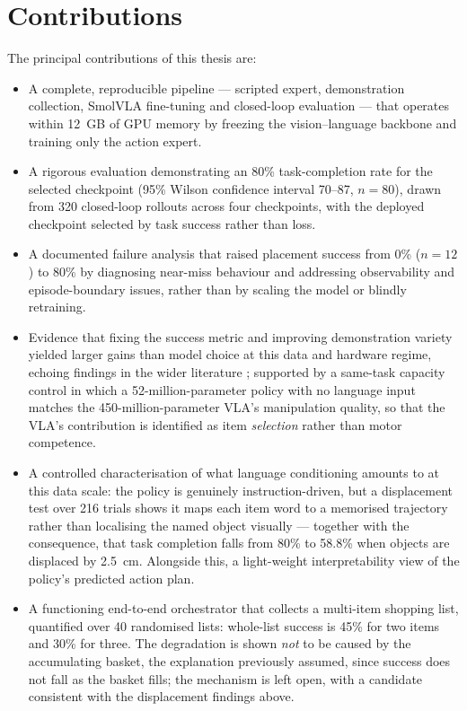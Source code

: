 \section{Contributions}
\label{sec:contributions}
The principal contributions of this thesis are:
\begin{itemize}
    \item A complete, reproducible pipeline --- scripted expert, demonstration
    collection, SmolVLA fine-tuning and closed-loop evaluation --- that operates
    within 12~GB of GPU memory by freezing the vision--language backbone and
    training only the action expert.
    \item A rigorous evaluation demonstrating an 80\% task-completion rate for the
    selected checkpoint (95\% Wilson confidence interval 70--87, $n=80$), drawn from
    320 closed-loop rollouts across four checkpoints, with the deployed checkpoint
    selected by task success rather than loss.
    \item A documented failure analysis that raised placement success from 0\%
    ($n=12$) to 80\% by diagnosing near-miss behaviour and addressing observability and
    episode-boundary issues, rather than by scaling the model or blindly
    retraining.
    \item Evidence that fixing the success metric and improving demonstration
    variety yielded larger gains than model choice at this data and hardware
    regime, echoing findings in the wider literature
    \parencite{black2025pi05, bharadhwaj2024roboagent}; supported by a same-task
    capacity control in which a 52-million-parameter policy with no language input
    matches the 450-million-parameter VLA's manipulation quality, so that the VLA's
    contribution is identified as item \emph{selection} rather than motor competence.
    \item A controlled characterisation of what language conditioning amounts to at
    this data scale: the policy is genuinely instruction-driven, but a displacement
    test over 216 trials shows it maps each item word to a memorised trajectory rather
    than localising the named object visually --- together with the consequence, that
    task completion falls from 80\% to 58.8\% when objects are displaced by
    \SI{2.5}{cm}. Alongside this, a light-weight interpretability view of the policy's
    predicted action plan.
    \item A functioning end-to-end orchestrator that collects a multi-item shopping
    list, quantified over 40 randomised lists: whole-list success is 45\% for two
    items and 30\% for three. The degradation is shown \emph{not} to be caused by the
    accumulating basket, the explanation previously assumed, since success does not
    fall as the basket fills; the mechanism is left open, with a candidate consistent
    with the displacement findings above.
\end{itemize}

